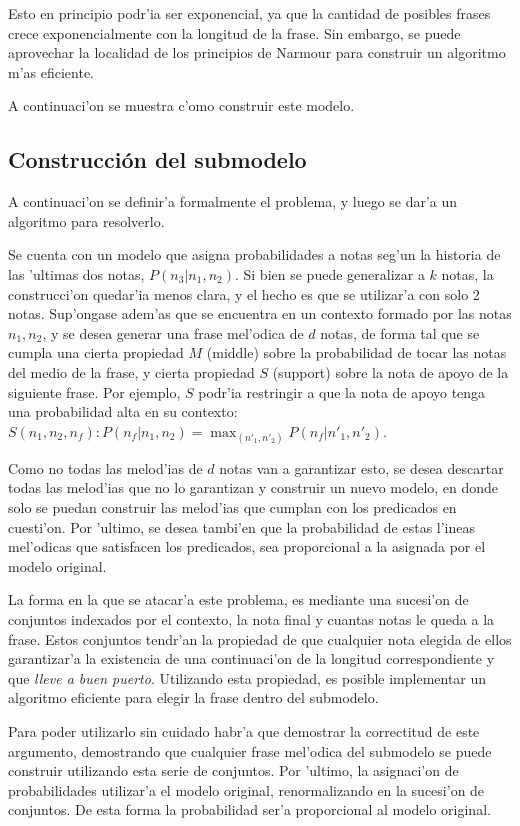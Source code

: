 Esto en principio podr'ia ser exponencial, ya que la cantidad de posibles frases crece exponencialmente con la longitud de la frase.
Sin embargo, se puede aprovechar la localidad de los principios de Narmour para construir un algoritmo m'as eficiente.  

A continuaci'on se muestra c'omo construir este modelo. 


\subsection{Construcci\'on del submodelo}
\label{sec:phrase_model}
A continuaci'on se definir'a formalmente el problema, y luego se dar'a un algoritmo para resolverlo.

Se cuenta con un modelo que asigna probabilidades a notas seg'un la historia de las 'ultimas dos notas, $P(n_3 | n_1, n_2)$. Si bien se puede generalizar a $k$ notas,
la construcci'on quedar'ia menos clara, y el hecho es que se utilizar'a con solo 2 notas. Sup'ongase adem'as que se encuentra en un contexto formado por las notas 
$n_1, n_2$, y se desea generar una frase mel'odica de $d$ notas, de forma tal que se cumpla una cierta propiedad $M$ (middle) sobre la probabilidad de tocar las notas
del medio de la frase, y cierta propiedad $S$ (support) sobre la nota de apoyo de la siguiente frase. Por ejemplo, $S$ podr'ia restringir a 
que la nota de apoyo tenga una probabilidad alta en su contexto: $S(n_1, n_2, n_f): P(n_f | n_1, n_2) = \max_{(n'_1, n'_2)}{P(n_f | n'_1, n'_2)}$.

Como no todas las melod'ias de $d$ notas van a garantizar esto, se desea descartar todas las melod'ias que no lo garantizan y construir un nuevo modelo, en donde
solo se puedan construir las melod'ias que cumplan con los predicados en cuesti'on. Por 'ultimo, se desea tambi'en que la probabilidad de estas l'ineas mel'odicas 
que satisfacen los predicados, sea proporcional a la asignada por el modelo original. 

La forma en la que se atacar'a este problema, es mediante una sucesi'on de conjuntos indexados por el contexto, la nota final y cuantas notas le queda
a la frase. Estos conjuntos tendr'an la propiedad de que cualquier nota elegida de ellos garantizar'a la existencia de una continuaci'on de la longitud correspondiente 
 y que \emph{lleve a buen puerto}. Utilizando esta propiedad, es posible implementar un algoritmo eficiente para elegir la frase dentro del submodelo. 

Para poder utilizarlo sin cuidado habr'a que demostrar la correctitud de este argumento, demostrando que cualquier frase mel'odica del submodelo se puede construir
utilizando esta serie de conjuntos. Por 'ultimo, la asignaci'on de probabilidades utilizar'a el modelo original, renormalizando en la sucesi'on de conjuntos. De esta 
forma la probabilidad ser'a proporcional al modelo original.

